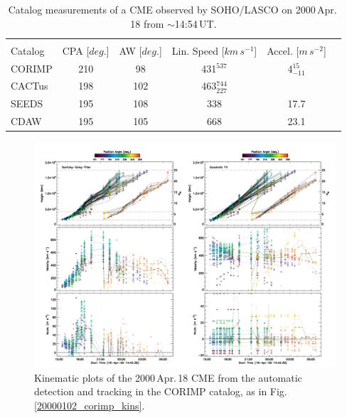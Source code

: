 \documentclass[referee,a4paper,12pt,traditabstract]{swsc}
\begin{document}
\begin{linenumbers}
\begin{table}[h]
\begin{tabular}{l*{4}{c}r}
\multicolumn{5}{c}{} \\

Catalog              & CPA [$deg.$] & AW [$deg.$] & Lin. Speed [$km\,s^{-1}$] & Accel. [$m\,s^{-2}$]  \\
\hline
CORIMP      & 210 & 98 & 431$^{537}$ & 4$_{-11}^{15}$   \\
CACTus     & 198 & 102 & 463$_{227}^{744}$ &     \\
SEEDS        & 195 & 108 & 338 & 17.7    \\
CDAW         & 195 & 105 & 668 & 23.1    \\
\end{tabular}
\caption{Catalog measurements of a CME observed by SOHO/LASCO on 2000\,Apr.\,18 from $\sim$14:54\,UT.}
\label{table_20000418}
\end{table}

\begin{figure}[t]
\centerline{\includegraphics[width=\linewidth]{images/20000418_corimp_kins.pdf}}
\caption{Kinematic plots of the 2000\,Apr.\,18 CME from the automatic detection and tracking in the CORIMP catalog, as in Fig.\,\ref{20000102_corimp_kins}.}
\label{20000418_corimp_kins}
\end{figure}


\end{linenumbers}
\end{document}
